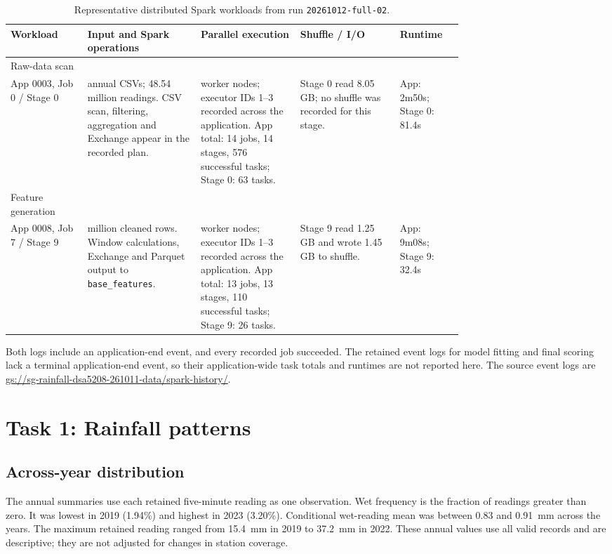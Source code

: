 \documentclass[11pt,a4paper]{article}
\newcommand{\runid}{20261012-full-02}
\begin{document}
\begin{table}[htbp]
\centering\footnotesize
\setlength{\tabcolsep}{3pt}
\renewcommand{\arraystretch}{1.1}
\caption{Representative distributed Spark workloads from run \texttt{\runid}.}
\label{tab:spark-job-evidence}
\begin{tabularx}{\linewidth}{@{}>{\raggedright\arraybackslash}p{0.17\linewidth}>{\raggedright\arraybackslash}X>{\raggedright\arraybackslash}p{0.22\linewidth}>{\raggedright\arraybackslash}p{0.22\linewidth}>{\raggedright\arraybackslash}p{0.14\linewidth}@{}}
\toprule
Workload & Input and Spark operations & Parallel execution & Shuffle / I/O & Runtime \\
\midrule
Raw-data scan\\App 0003, Job 0 / Stage 0 &
8 annual CSVs; 48.54 million readings. CSV scan, filtering, aggregation and
Exchange appear in the recorded plan. &
2 worker nodes; executor IDs 1--3 recorded across the application. App total:
14 jobs, 14 stages, 576 successful tasks; Stage 0: 63 tasks. &
Stage 0 read 8.05 GB; no shuffle was recorded for this stage. &
App: 2m50s; Stage 0: 81.4s \\
Feature generation\\App 0008, Job 7 / Stage 9 &
48.54 million cleaned rows. Window calculations, Exchange and Parquet output
to \texttt{base\_features}. &
2 worker nodes; executor IDs 1--3 recorded across the application. App total:
13 jobs, 13 stages, 110 successful tasks; Stage 9: 26 tasks. &
Stage 9 read 1.25 GB and wrote 1.45 GB to shuffle. &
App: 9m08s; Stage 9: 32.4s \\
\bottomrule
\end{tabularx}
\end{table}

Both logs include an application-end event, and every recorded job succeeded.
The retained event logs for model fitting and final scoring lack a terminal
application-end event, so their application-wide task totals and runtimes are
not reported here. The source event logs are
\url{gs://sg-rainfall-dsa5208-261011-data/spark-history/}.

\section{Task 1: Rainfall patterns}
\subsection{Across-year distribution}
The annual summaries use each retained five-minute reading as one observation.
Wet frequency is the fraction of readings greater than zero. It was lowest in
2019 (1.94\%) and highest in 2023 (3.20\%). Conditional wet-reading mean was
between 0.83 and 0.91~mm across the years. The maximum retained reading ranged
from 15.4~mm in 2019 to 37.2~mm in 2022. These annual values use all valid
records and are descriptive; they are not adjusted for changes in station
coverage.
\end{document}
